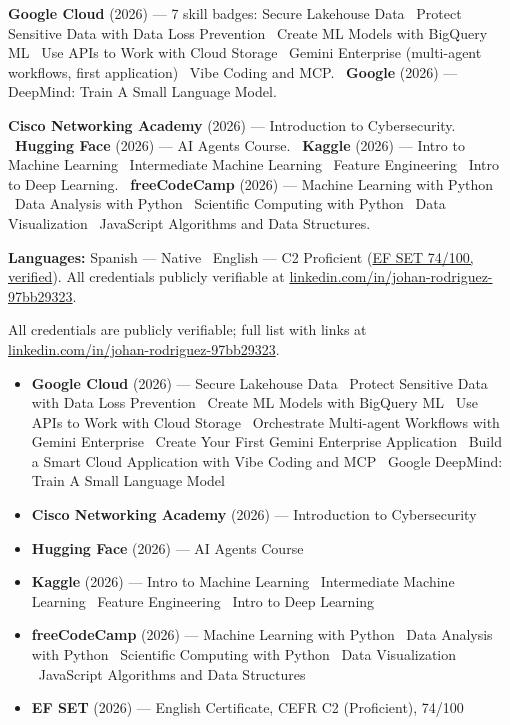 \ifonepage
{\footnotesize\noindent
\textbf{Google Cloud} (2026) --- 7 skill badges: Secure Lakehouse Data \textbullet\ Protect Sensitive
Data with Data Loss Prevention \textbullet\ Create ML Models with BigQuery ML \textbullet\ Use APIs to
Work with Cloud Storage \textbullet\ Gemini Enterprise (multi-agent workflows, first application)
\textbullet\ Vibe Coding and MCP. \ \textbf{Google} (2026) --- DeepMind: Train A Small Language Model.\par
\vspace{0.2ex}\noindent
\textbf{Cisco Networking Academy} (2026) --- Introduction to Cybersecurity. \
\textbf{Hugging Face} (2026) --- AI Agents Course. \
\textbf{Kaggle} (2026) --- Intro to Machine Learning \textbullet\ Intermediate Machine Learning
\textbullet\ Feature Engineering \textbullet\ Intro to Deep Learning. \
\textbf{freeCodeCamp} (2026) --- Machine Learning with Python \textbullet\ Data Analysis with Python
\textbullet\ Scientific Computing with Python \textbullet\ Data Visualization \textbullet\ JavaScript
Algorithms and Data Structures.\par
\vspace{0.2ex}\noindent
\textbf{Languages:} Spanish --- Native \textbullet\ English --- C2 Proficient
(\href{https://cert.efset.org/es/qpqdd3}{EF SET 74/100, verified}).
{\color{subtle}All credentials publicly verifiable at
\href{https://www.linkedin.com/in/johan-rodriguez-97bb29323/details/certifications/}{linkedin.com/in/johan-rodriguez-97bb29323}.}\par}
\else
{\footnotesize\color{subtle}All credentials are publicly verifiable; full list with links at
\href{https://www.linkedin.com/in/johan-rodriguez-97bb29323/details/certifications/}{linkedin.com/in/johan-rodriguez-97bb29323}.}
\vspace{0.4ex}
\begin{itemize}
  \item \textbf{Google Cloud} (2026) --- Secure Lakehouse Data \textbullet\ Protect Sensitive Data with
        Data Loss Prevention \textbullet\ Create ML Models with BigQuery ML \textbullet\ Use APIs to Work
        with Cloud Storage \textbullet\ Orchestrate Multi-agent Workflows with Gemini Enterprise
        \textbullet\ Create Your First Gemini Enterprise Application \textbullet\ Build a Smart Cloud
        Application with Vibe Coding and MCP \textbullet\ Google DeepMind: Train A Small Language Model
  \item \textbf{Cisco Networking Academy} (2026) --- Introduction to Cybersecurity
  \item \textbf{Hugging Face} (2026) --- AI Agents Course
  \item \textbf{Kaggle} (2026) --- Intro to Machine Learning \textbullet\ Intermediate Machine Learning
        \textbullet\ Feature Engineering \textbullet\ Intro to Deep Learning
  \item \textbf{freeCodeCamp} (2026) --- Machine Learning with Python \textbullet\ Data Analysis with
        Python \textbullet\ Scientific Computing with Python \textbullet\ Data Visualization
        \textbullet\ JavaScript Algorithms and Data Structures
  \item \textbf{EF SET} (2026) --- English Certificate, CEFR C2 (Proficient), 74/100
\end{itemize}
